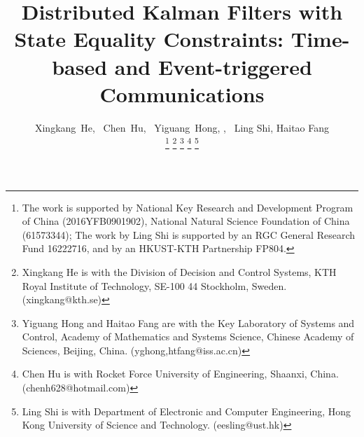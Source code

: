 \documentclass[journal,transmag]{IEEEtran}
\begin{document}
	
	
	\title{Distributed Kalman Filters with State Equality Constraints: Time-based and Event-triggered Communications}
	
	\author{Xingkang~He,
		~Chen~Hu,
		~Yiguang~Hong,
		,~ Ling Shi, Haitao Fang
		
		\thanks{The work is supported by National Key Research and Development Program of China (2016YFB0901902), National Natural Science Foundation of China (61573344);
			The work by Ling Shi is supported by an RGC General Research Fund 16222716, and by an HKUST-KTH Partnership FP804.
	}%
			\thanks{Xingkang He is with the  Division of Decision and Control Systems,  KTH Royal Institute of
				Technology, SE-100 44 Stockholm, Sweden. (xingkang@kth.se)}
		\thanks{Yiguang Hong and Haitao Fang  are with the Key Laboratory of Systems and Control,  Academy of Mathematics and Systems Science,
			Chinese Academy of Sciences, Beijing, China. (yghong,htfang@iss.ac.cn)}
		\thanks{Chen Hu is with Rocket Force University of Engineering, Shaanxi, China. (chenh628@hotmail.com)}
		\thanks{Ling Shi is with Department of Electronic and Computer Engineering, Hong Kong University of Science and Technology. (eesling@ust.hk)}
	}
	
	
	\maketitle
	
\end{document}

